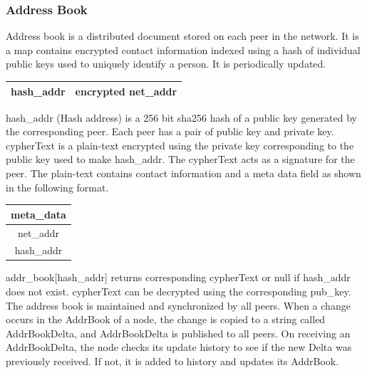 \documentclass[a4paper,11pt]{article}
\begin{document}
\subsubsection{Address Book}
Address book is a distributed document stored on each peer in the network. It is a map contains encrypted contact information indexed using  a hash of individual public keys used to uniquely identify a person. It is periodically updated. 
\begin{center}
  \begin{tabular}{ | c | c | }
    \hline
    hash\_addr & encrypted net\_addr\\
    \hline
  \end{tabular}
\end{center}
hash\_addr (Hash address)  is a 256 bit sha256 hash of a public key generated by the corresponding peer. Each peer has a pair of public key and private key.
cypherText is a plain-text encrypted using the private key corresponding to the public key used to make hash\_addr. The cypherText acts as a signature for the peer. The plain-text contains contact information and a meta data field as shown in the following format.
\begin{center}
  \begin{tabular}{ | c | }
    \hline
    meta\_data\\
    \hline
    net\_addr\\
    \hline
    hash\_addr\\
    \hline
  \end{tabular}
\end{center}
addr\_book[hash\_addr] returns corresponding cypherText or null if hash\_addr does not exist.
cypherText can be decrypted using the corresponding pub\_key.
The address book is maintained and synchronized by all peers. When a change occurs in the AddrBook of a node, the change is copied to a string called AddrBookDelta, and AddrBookDelta is published to all peers. On receiving an AddrBookDelta, the node checks its update history to see if the new Delta was previously received. If not, it is added to history and updates its AddrBook.
    
\end{document}
